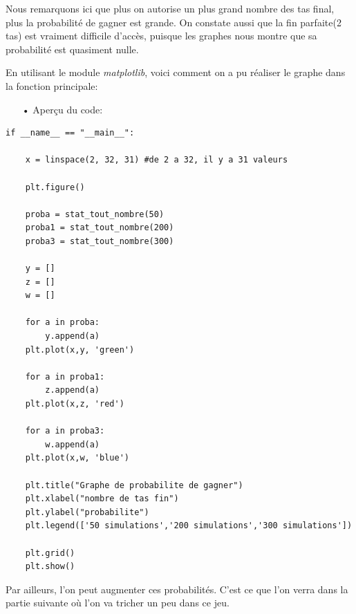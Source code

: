 \par Nous remarquons ici que plus on autorise un plus grand nombre des tas final, plus la probabilité de gagner est grande. On constate aussi que la fin parfaite(2 tas) est vraiment difficile d'accès, puisque les graphes nous montre que sa probabilité est quasiment nulle.
\par En utilisant le module \emph{matplotlib}, voici comment on a pu réaliser le graphe dans la fonction principale:
	\\
	\begin{itemize}
	\color{blue}\item[•]Aperçu du code:
	\end{itemize}
	
	\lstset{language=Python}
	\lstset{frame=lines}
	\lstset{basicstyle=\footnotesize}
	\begin{lstlisting}
if __name__ == "__main__":

    x = linspace(2, 32, 31) #de 2 a 32, il y a 31 valeurs
    
    plt.figure()

    proba = stat_tout_nombre(50)
    proba1 = stat_tout_nombre(200)
    proba3 = stat_tout_nombre(300)

    y = []
    z = []
    w = []

    for a in proba:
        y.append(a)
    plt.plot(x,y, 'green')

    for a in proba1:
        z.append(a)
    plt.plot(x,z, 'red')

    for a in proba3:
        w.append(a)
    plt.plot(x,w, 'blue')

    plt.title("Graphe de probabilite de gagner")
    plt.xlabel("nombre de tas fin")
    plt.ylabel("probabilite")
    plt.legend(['50 simulations','200 simulations','300 simulations'])

    plt.grid()
    plt.show()
	\end{lstlisting}
\par Par ailleurs, l'on peut augmenter ces probabilités. C'est ce que l'on verra dans la partie suivante où l'on va tricher un peu dans ce jeu.